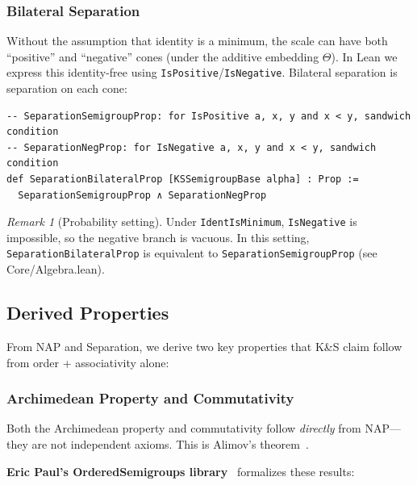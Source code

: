 \documentclass[11pt]{article}
\theoremstyle{definition}
\theoremstyle{remark}
\newtheorem{remark}[theorem]{Remark}
\begin{document}
\subsubsection{Bilateral Separation}

Without the assumption that identity is a minimum, the scale can have both ``positive'' and ``negative''
cones (under the additive embedding $\Theta$). In Lean we express this identity-free using
\texttt{IsPositive}/\texttt{IsNegative}. Bilateral separation is separation on each cone:

\begin{lstlisting}[caption={Bilateral separation (\href{https://github.com/zariuq/ks-foundations-of-inference/blob/main/KnuthSkilling/Core/Algebra.lean}{Core/Algebra.lean})},numbers=none]
-- SeparationSemigroupProp: for IsPositive a, x, y and x < y, sandwich condition
-- SeparationNegProp: for IsNegative a, x, y and x < y, sandwich condition
def SeparationBilateralProp [KSSemigroupBase alpha] : Prop :=
  SeparationSemigroupProp ∧ SeparationNegProp
\end{lstlisting}

\begin{remark}[Probability setting]
Under \texttt{IdentIsMinimum}, \texttt{IsNegative} is impossible, so the negative branch is vacuous.
In this setting, \texttt{SeparationBilateralProp} is equivalent to \texttt{SeparationSemigroupProp}
(see Core/Algebra.lean).
\end{remark}

\subsection{Derived Properties}
\label{subsec:derived}

From NAP and Separation, we derive two key properties that K\&S claim follow from
order + associativity alone:

\subsubsection{Archimedean Property and Commutativity}

Both the Archimedean property and commutativity follow \emph{directly} from NAP---they are not
independent axioms. This is Alimov's theorem~\cite{Alimov1950,Klazar2016}.

\textbf{Eric Paul's OrderedSemigroups library}~\cite{Paul2024} formalizes these results:
\end{document}
